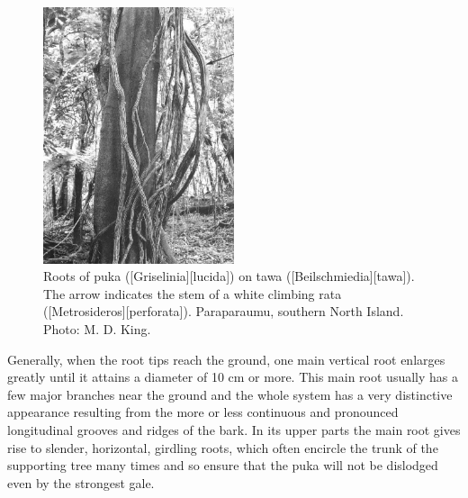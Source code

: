 \begin{figure}
	\includegraphics[width=0.5\textwidth]{graphics/figure47puka-roots.jpg}
	\centering
	\caption[Roots of puka on tawa]{Roots of puka ([Griselinia][lucida]) on tawa ([Beilschmiedia][tawa]).
	The arrow indicates the stem of a white climbing rata ([Metrosideros][perforata]).
	Paraparaumu, southern North Island.
	Photo: M. D. King.}%
	\label{fig:47puka-roots}
\end{figure}

Generally, when the root tips reach the ground, one main vertical root enlarges greatly until it attains a diameter of 10 cm or more.
This main root usually has a few major branches near the ground and the whole system has a very distinctive appearance resulting from the more or less continuous and pronounced longitudinal grooves and ridges of the bark.
In its upper parts the main root gives rise to slender, horizontal, girdling roots, which often encircle the trunk of the supporting tree many times and so ensure that the puka will not be dislodged even by the strongest gale.

